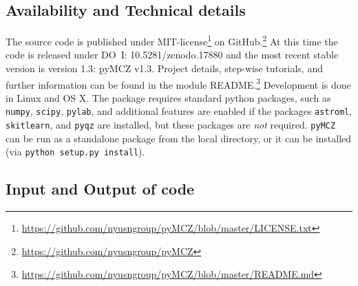 \documentclass{emulateapj}
\begin{document}
\subsection{Availability and Technical details}
The source code is published under
MIT-license\footnote{\url{https://github.com/nyusngroup/pyMCZ/blob/master/LICENSE.txt}}
on GitHub.\footnote{\url{https://github.com/nyusngroup/pyMCZ}} At this
time the code is released under DO~I: 10.5281/zenodo.17880 and the
most recent stable version is version 1.3: {\b pyMCZ v1.3}. Project
details, step-wise tutorials, and further information can be found in
the module
README.\footnote{\url{https://github.com/nyusngroup/pyMCZ/blob/master/README.md}}
Development is done in Linux and OS X. The package requires standard
python packages, such as \verb=numpy=, \verb=scipy=, \verb=pylab=, and
additional features are enabled if the packages \verb=astroml=,
\verb=skitlearn=, and \verb=pyqz= are installed, but these packages
are \emph{not} required.  \verb=pyMCZ= can be
run as a standalone package from the local directory, or it can be
installed (via \verb=python setup.py install=).


\subsection{Input and Output of code}\label{sec:IO}
\end{document}
